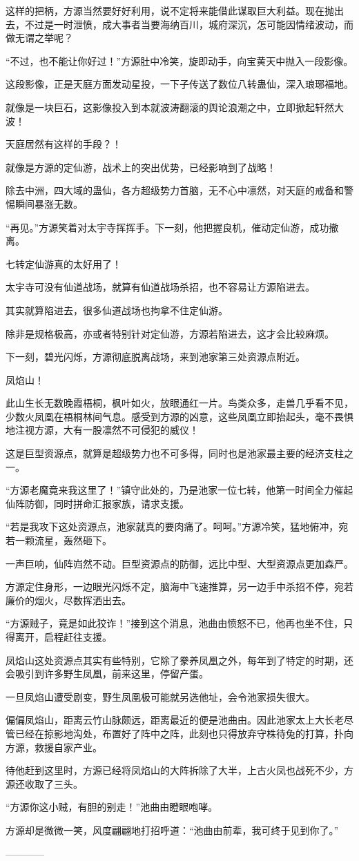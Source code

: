 \begin{this_body}
这样的把柄，方源当然要好好利用，说不定将来能借此谋取巨大利益。现在抛出去，不过是一时泄愤，成大事者当要海纳百川，城府深沉，怎可能因情绪波动，而做无谓之举呢？

“不过，也不能让你好过！”方源肚中冷笑，旋即动手，向宝黄天中抛入一段影像。

这段影像，正是天庭方面发动星投，一下子传送了数位八转蛊仙，深入琅琊福地。

就像是一块巨石，这影像投入到本就波涛翻滚的舆论浪潮之中，立即掀起轩然大波！

天庭居然有这样的手段？！

就像是方源的定仙游，战术上的突出优势，已经影响到了战略！

除去中洲，四大域的蛊仙，各方超级势力首脑，无不心中凛然，对天庭的戒备和警惕瞬间暴涨无数。

“再见。”方源笑着对太宇寺挥挥手。下一刻，他把握良机，催动定仙游，成功撤离。

七转定仙游真的太好用了！

太宇寺可没有仙道战场，就算有仙道战场杀招，也不容易让方源陷进去。

其实就算陷进去，很多仙道战场也拘拿不住定仙游。

除非是规格极高，亦或者特别针对定仙游，方源若陷进去，这才会比较麻烦。

下一刻，碧光闪烁，方源彻底脱离战场，来到池家第三处资源点附近。

凤焰山！

此山生长无数晚霞梧桐，枫叶如火，放眼通红一片。鸟类众多，走兽几乎看不见，少数火凤凰在梧桐林间气息。感受到方源的凶意，这些凤凰立即抬起头，毫不畏惧地注视方源，大有一股凛然不可侵犯的威仪！

这是巨型资源点，就算是超级势力也不可多得，同时也是池家最主要的经济支柱之一。

“方源老魔竟来我这里了！”镇守此处的，乃是池家一位七转，他第一时间全力催起仙阵防御，同时拼命汇报家族，请求支援。

“若是我攻下这处资源点，池家就真的要肉痛了。呵呵。”方源冷笑，猛地俯冲，宛若一颗流星，轰然砸下。

一声巨响，仙阵岿然不动。巨型资源点的防御，远比中型、大型资源点更加森严。

方源定住身形，一边眼光闪烁不定，脑海中飞速推算，另一边手中杀招不停，宛若廉价的烟火，尽数挥洒出去。

“方源贼子，竟是如此狡诈！”接到这个消息，池曲由愤怒不已，他再也坐不住，只得离开，启程赶往支援。

凤焰山这处资源点其实有些特别，它除了豢养凤凰之外，每年到了特定的时期，还会吸引到许多野生凤凰，前来这里，停留产蛋。

一旦凤焰山遭受剧变，野生凤凰极可能就另选他址，会令池家损失很大。

偏偏凤焰山，距离云竹山脉颇远，距离最近的便是池曲由。因此池家太上大长老尽管已经在掠影地沟处，布置好了阵中之阵，此刻也只得放弃守株待兔的打算，扑向方源，救援自家产业。

待他赶到这里时，方源已经将凤焰山的大阵拆除了大半，上古火凤也战死不少，方源还收取了三头。

“方源你这小贼，有胆的别走！”池曲由瞪眼咆哮。

方源却是微微一笑，风度翩翩地打招呼道：“池曲由前辈，我可终于见到你了。”

------------

\end{this_body}

